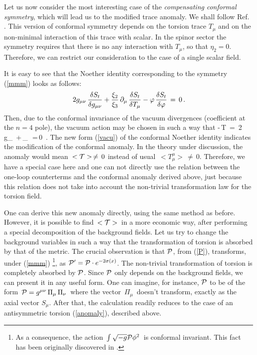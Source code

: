 Let us now consider the most interesting case of the 
{\it compensating conformal symmetry}, which 
will lead us to the modified trace anomaly. We shall
follow Ref. \cite{anhesh}. This version of conformal 
symmetry depends on the torsion trace $T_\mu$ and on the 
non-minimal interaction of this trace with 
scalar. In the spinor sector the symmetry requires
that there is no any interaction with $T_\mu$, so that
$\eta_2=0$. Therefore, we can restrict our consideration 
to the case of a single scalar field. 

It is easy to see that the Noether identity corresponding 
to the symmetry (\ref{mmm}) looks as follows: 
$$ %
\,2 g_{\mu\nu}\,\frac{\de
S_t}{\de g_{\mu\nu}} +\frac{\xi_2}{\xi_3}\,\pa_\mu\,\frac{\de
S_t}{\de T_\mu} - \ph\,\frac{\de S_t}{\de \ph}  \,=\,0 \,.
$$ %
Then, due to the conformal invariance of the vacuum
divergences (coefficient at the $n=4$ pole), 
the vacuum action may be chosen in such a way
that 
\beq 
-\,{\cal T}\, = 
\,2 g_{\mu\nu}\,
+\,\pa_\mu\,
  \,=\,0 \,.
\label{vacu}
\eeq
The new form (\ref{vacu}) of the conformal Noether
identity indicates the modification of the
conformal anomaly. In the theory under discussion, the
anomaly would mean $\,<{\cal T}>\,\neq\,0$ instead
of usual $\,<{T}^\mu_\mu>\,\neq\,0$. Therefore,
we have a special case here and one can not
directly use the relation between the one-loop
counterterms and the conformal anomaly derived above,
just because this relation does not
take into account the non-trivial transformation law
for the torsion field. 

One can derive this new anomaly directly, using 
the same method as before. However, it is possible to
find $\,<{\cal T}>\,$ in a more economic way, after 
performing a special decomposition of the background fields.
Let us try to change the background variables in such
a way that the transformation of torsion is absorbed by
that of the metric. The crucial observation is that ${\cal P}$, 
from (\ref{P}), transforms, under (\ref{mmm})
\footnote{As a
consequence, the action $\,\int\sqrt{-g}{\cal P}\phi^2\,$ 
is conformal invariant. This fact has been originally 
discovered in \cite{obukhov}.},
as ${\cal P}^\prime = {\cal P} \cdot e^{-2\sigma(x)}$. 
The non-trivial transformation of
torsion is completely absorbed by ${\cal P}$. 
Since ${\cal P}$ only depends on
the background fields, we can present it in any
useful form. One can imagine, for instance, ${\cal P}$
to be of the form $\,{\cal P}=g^{\mu\nu}\,\Pi_\mu\,\Pi_\nu\,$ 
where the vector $\,\Pi_\mu\,$
doesn't transform, exactly as the axial vector $S_\mu$. 
After that, the calculation readily reduces to the case of an 
antisymmetric torsion (\ref{anomaly}), described above. 

